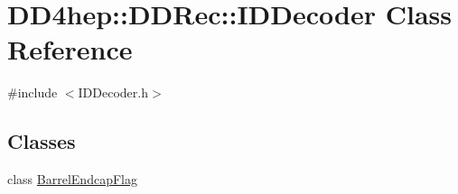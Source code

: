 \hypertarget{class_d_d4hep_1_1_d_d_rec_1_1_i_d_decoder}{
\section{DD4hep::DDRec::IDDecoder Class Reference}
\label{class_d_d4hep_1_1_d_d_rec_1_1_i_d_decoder}
}


{\ttfamily \#include $<$IDDecoder.h$>$}\subsection*{Classes}
\begin{DoxyCompactItemize}
\item 
class \hyperlink{class_d_d4hep_1_1_d_d_rec_1_1_i_d_decoder_1_1_barrel_endcap_flag}{BarrelEndcapFlag}
\end{DoxyCompactItemize}
